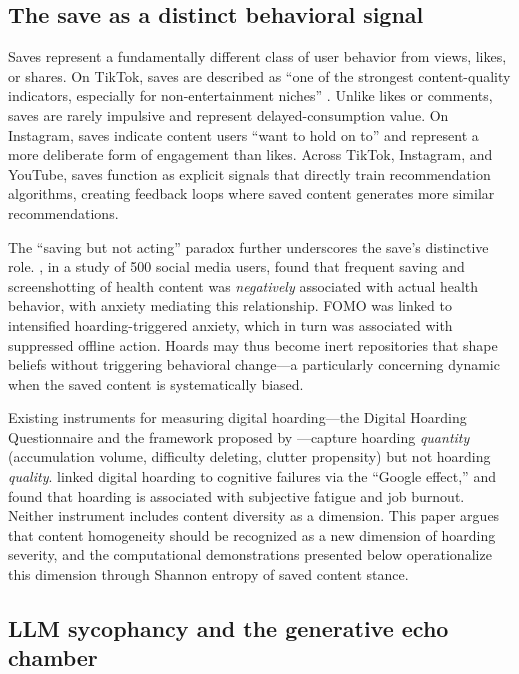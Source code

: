\documentclass[12pt,a4paper]{article}
\begin{document}
\subsection{The save as a distinct behavioral signal}

Saves represent a fundamentally different class of user behavior from views, likes, or shares.
On TikTok, saves are described as ``one of the strongest content-quality indicators, especially for non-entertainment niches'' \citep{SproutSocial2026}.
Unlike likes or comments, saves are rarely impulsive and represent delayed-consumption value.
On Instagram, saves indicate content users ``want to hold on to'' and represent a more deliberate form of engagement than likes.
Across TikTok, Instagram, and YouTube, saves function as explicit signals that directly train recommendation algorithms, creating feedback loops where saved content generates more similar recommendations.

The ``saving but not acting'' paradox further underscores the save's distinctive role.
\citet{Huang2025}, in a study of 500 social media users, found that frequent saving and screenshotting of health content was \emph{negatively} associated with actual health behavior, with anxiety mediating this relationship.
FOMO was linked to intensified hoarding-triggered anxiety, which in turn was associated with suppressed offline action.
Hoards may thus become inert repositories that shape beliefs without triggering behavioral change---a particularly concerning dynamic when the saved content is systematically biased.

Existing instruments for measuring digital hoarding---the Digital Hoarding Questionnaire \citep{Neave2019} and the framework proposed by \citet{Sedera2022}---capture hoarding \emph{quantity} (accumulation volume, difficulty deleting, clutter propensity) but not hoarding \emph{quality}.
\citet{LiuLiu2024} linked digital hoarding to cognitive failures via the ``Google effect,'' and \citet{Mu2025} found that hoarding is associated with subjective fatigue and job burnout.
Neither instrument includes content diversity as a dimension.
This paper argues that content homogeneity should be recognized as a new dimension of hoarding severity, and the computational demonstrations presented below operationalize this dimension through Shannon entropy of saved content stance.


\subsection{LLM sycophancy and the generative echo chamber}
\end{document}
